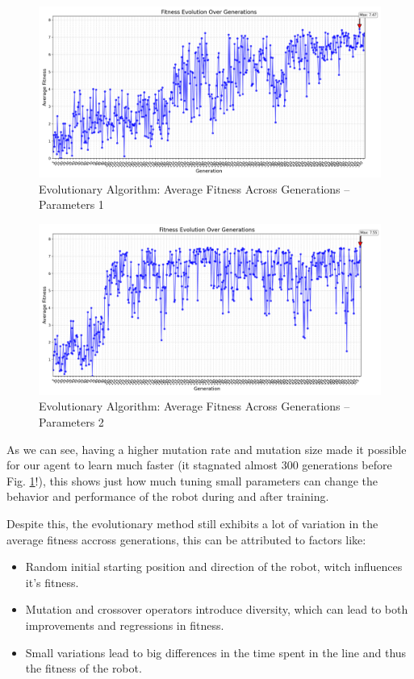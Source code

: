 \documentclass[final,5p,times,twocolumn,authoryear]{elsarticle}
\begin{document}
\begin{figure}[H]
    \centering
    \includegraphics[width=1\linewidth]{figures/evolutivo_params_1.png}
    \caption{Evolutionary Algorithm: Average Fitness Across Generations – Parameters 1}
    \label{fig:evolv-params1}
\end{figure}

\begin{figure}[H]
    \centering
    \includegraphics[width=1\linewidth]{figures/evolutivo_params2.png}
    \caption{Evolutionary Algorithm: Average Fitness Across Generations – Parameters 2}
    \label{fig:evolv-params2}
\end{figure}

As we can see, having a higher mutation rate and mutation size made it possible for our agent to learn much faster (it stagnated almost 300 generations before Fig. \ref{fig:evolv-params1}!), this shows just how much tuning small parameters can change the behavior and performance of the robot during and after training.

Despite this, the evolutionary method still exhibits a lot of variation in the average fitness accross generations, this can be attributed to factors like:

\begin{itemize}
    \item Random initial starting position and direction of the robot, witch influences it's fitness.
    
    \item Mutation and crossover operators introduce diversity, which can lead to both improvements and regressions in fitness.
    
    \item Small variations lead to big differences in the time spent in the line and thus the fitness of the robot.
\end{itemize}
\end{document}
